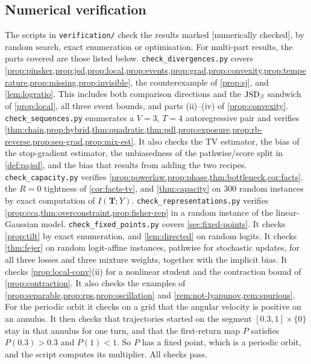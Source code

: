 \subsection{Numerical verification}

The scripts in \texttt{verification/} check the results marked \textsf{[numerically checked]}, by random
search, exact enumeration or optimisation. For multi-part results, the parts covered are those listed
below. \texttt{check\_divergences.py} covers
\cref{prop:pinsker,prop:jsd,prop:local,prop:events,prop:grad,prop:convexity,prop:temperature,prop:missing,prop:invisible}, the
counterexample of \cref{prop:sj}, and \cref{lem:logratio}. This includes both comparison directions and the
$\mathrm{JSD}_\beta$ sandwich of \cref{prop:local}, all three event bounds, and parts (ii)--(iv) of \cref{prop:convexity}. \texttt{check\_sequences.py} enumerates a $V=3$, $T=4$
autoregressive pair and verifies
\cref{thm:chain,prop:hybrid,thm:quadratic,thm:pdl,prop:exposure,prop:rb-reverse,prop:seq-grad,prop:mix-est}. It also checks the
TV estimator, the bias of the stop-gradient estimator, the unbiasedness of the pathwise/score split in
\cref{def:pajsd}, and the bias that results from adding the two recipes. \texttt{check\_capacity.py} verifies
\cref{prop:powerlaw,prop:phase,thm:bottleneck,cor:facts}, the $R=0$ tightness of \cref{cor:facts-tv}, and
\cref{thm:capacity} on 300 random instances by exact computation of $I(\mathbf T;Y)$. \texttt{check\_representations.py} verifies
\cref{prop:cca,thm:overconstraint,prop:fisher-rep} in a random instance of the linear-Gaussian model.
\texttt{check\_fixed\_points.py} covers \cref{sec:fixed-points}. It checks \cref{prop:tilt} by exact enumeration, and
\cref{lem:directed} on random logits. It checks \cref{thm:fejer} on random logit-affine instances, pathwise for
stochastic updates, for all three losses and three mixture weights, together with the implicit bias. It checks
\cref{prop:local-conv}(ii) for a nonlinear student and the contraction bound of \cref{prop:contraction}. It also checks the
examples of \cref{prop:separable,prop:rps,prop:oscillation} and \cref{rem:not-lyapunov,rem:spurious}. For the periodic orbit it checks on a grid that
the angular velocity is positive on an annulus. It then checks that trajectories started on the segment
$[0.3,1]\times\{0\}$ stay in that annulus for one turn, and that the first-return map $P$ satisfies $P(0.3)>0.3$ and $P(1)<1$.
So $P$ has a fixed point, which is a periodic orbit, and the script computes its multiplier. All checks pass.
